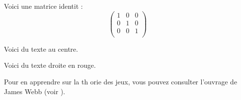 \documentclass{article}
\begin{document}
\newpage
    Voici une matrice identit :
    \[
        \begin{pmatrix}
         1    &0    & 0 \\
         0    & 1    & 0 \\
         0    & 0    & 1 \\
        \end{pmatrix}
    \]
    \begin{center}
        Voici du texte au centre.
    \end{center}
    \begin{flushright}
                {\color{red}Voici du texte   droite en rouge.}
    \end{flushright}
Pour en apprendre sur la th orie des jeux, vous pouvez consulter l'ouvrage de James Webb (voir \cite{Webb}).
\newpage
\end{document}
